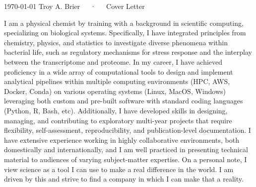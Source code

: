 \documentclass[11pt, a4paper]{awesome-cv}
\begin{document}
	\makecvheader[R]
	\makecvfooter
	{\today}
	{Troy A. Brier~~~·~~~Cover Letter}
	{}
	\makelettertitle
	\begin{cvletter}
		\vspace{-15pt}
		\vspace{-7.5pt}
		I am a physical chemist by training with a background in scientific computing, specializing on biological systems.
		Specifically, I have integrated principles from chemistry, physics, and statistics to investigate diverse phenomena within bacterial life, such as regulatory mechanisms for stress response and the interplay between the transcriptome and proteome.	
		In my career, I have achieved proficiency in a wide array of computational tools to design and implement analytical pipelines within multiple computing environments (HPC, AWS, Docker, Conda) on various operating systems (Linux, MacOS, Windows) leveraging both custom and pre-built software with standard coding languages (Python, R, Bash, etc).
		Additionally, I have developed skills in designing, managing, and contributing to exploratory multi-year projects that require flexibility, self-assessment, reproducibility, and publication-level documentation.
		I have extensive experience working in highly collaborative environments, both domestically and internationally, and I am well practiced in presenting technical material to audiences of varying subject-matter expertise. On a personal note, I view science as a tool I can use to make a real difference in the world. I am driven by this and strive to find a company in which I can make that a reality. %
		

\end{cvletter}
\end{document}

